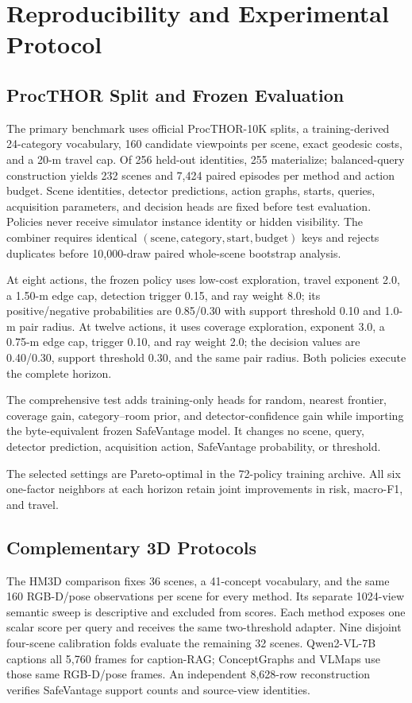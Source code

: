 \documentclass{article}
\newcommand{\method}{SafeVantage}
\begin{document}
\setlength{\bibsep}{2pt plus 0.3ex}



\clearpage
\appendix

\section{Reproducibility and Experimental Protocol}
\label{app:contract}
\subsection{ProcTHOR Split and Frozen Evaluation}
\label{app:fresh-active}
The primary benchmark uses official ProcTHOR-10K splits, a training-derived 24-category vocabulary, 160 candidate viewpoints per scene, exact geodesic costs, and a 20-m travel cap. Of 256 held-out identities, 255 materialize; balanced-query construction yields 232 scenes and 7,424 paired episodes per method and action budget. Scene identities, detector predictions, action graphs, starts, queries, acquisition parameters, and decision heads are fixed before test evaluation. Policies never receive simulator instance identity or hidden visibility. The combiner requires identical $(\mathrm{scene},\mathrm{category},\mathrm{start},\mathrm{budget})$ keys and rejects duplicates before 10,000-draw paired whole-scene bootstrap analysis.

At eight actions, the frozen policy uses low-cost exploration, travel exponent 2.0, a 1.50-m edge cap, detection trigger 0.15, and ray weight 8.0; its positive/negative probabilities are 0.85/0.30 with support threshold 0.10 and 1.0-m pair radius. At twelve actions, it uses coverage exploration, exponent 3.0, a 0.75-m edge cap, trigger 0.10, and ray weight 2.0; the decision values are 0.40/0.30, support threshold 0.30, and the same pair radius. Both policies execute the complete horizon.

The comprehensive test adds training-only heads for random, nearest frontier, coverage gain, category--room prior, and detector-confidence gain while importing the byte-equivalent frozen \method{} model. It changes no scene, query, detector prediction, acquisition action, \method{} probability, or threshold.

The selected settings are Pareto-optimal in the 72-policy training archive. All six one-factor neighbors at each horizon retain joint improvements in risk, macro-F1, and travel.

\subsection{Complementary 3D Protocols}
The HM3D comparison fixes 36 scenes, a 41-concept vocabulary, and the same 160 RGB-D/pose observations per scene for every method. Its separate 1024-view semantic sweep is descriptive and excluded from scores. Each method exposes one scalar score per query and receives the same two-threshold adapter. Nine disjoint four-scene calibration folds evaluate the remaining 32 scenes. Qwen2-VL-7B captions all 5,760 frames for caption-RAG; ConceptGraphs and VLMaps use those same RGB-D/pose frames. An independent 8,628-row reconstruction verifies \method{} support counts and source-view identities.
\end{document}
